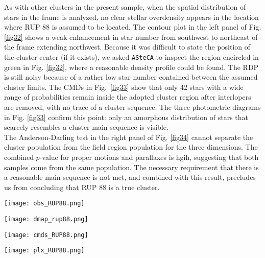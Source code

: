 \documentclass[draft]{aa}
\begin{document}
As with other clusters in the present sample, when the spatial distribution
of stars in the frame is analyzed, no clear stellar overdensity
appears in the location where RUP 88 is assumed to be located. The
contour plot in the left panel of Fig. \ref{fig32} shows a weak enhancement in star number from southwest to northeast of the frame extending northwest.
Because it was difficult to state the position of the cluster center (if it
exists), we asked \texttt{ASteCA} to inspect the region encircled in green in Fig.
\ref{fig32}, where a reasonable density profile could be found. The
RDP is still noisy because of a rather low star number contained between the
assumed cluster limits.
The CMDs in Fig.~\ref{fig33} show that only 42 stars with a wide
range of probabilities remain inside the adopted cluster region 
after interlopers are removed, with no trace of a cluster sequence.
The three photometric diagrams in Fig. \ref{fig33} confirm this point: only
an amorphous distribution of stars that scarcely resembles a cluster main sequence
is visible.\\

The Anderson-Darling test in the right panel of Fig. \ref{fig34} cannot
separate the cluster population from the field region population for the
three dimensions. The combined $p$-value for proper motions and
parallaxes is hgih, suggesting that both samples come from the same
population. The necessary requirement that there is a reasonable main
sequence is not met, and combined with this result, precludes
us from concluding that RUP 88 is a true cluster.

\begin{figure*}[ht]
    \centering
    \texttt{[image: obs\_RUP88.png]}
    \caption{Idem Fig. \ref{fig:photom_vdBH85} for RUP 88.}
    \label{fig31}
\end{figure*}
\begin{figure*}[ht]
    \centering
    \texttt{[image: dmap\_rup88.png]}
    \caption{Idem Fig. \ref{fig:struct_vdBH85} for RUP 88.}
    \label{fig32}
\end{figure*}
\begin{figure*}[ht]
    \centering
    \texttt{[image: cmds\_RUP88.png]}
    \caption{Idem Fig. \ref{fig:fundpars_vdBH85} for RUP 88
with the $(B-V)$ vs $(V-I)$ diagram instead of the $(B-V)$ vs. $(U-B)$
diagram.}
    \label{fig33}
\end{figure*}
\begin{figure*}[ht]
    \centering
    \texttt{[image: plx\_RUP88.png]}
    \caption{Idem Fig. \ref{fig:plx_bys_vdBH85} for RUP 88.}
    \label{fig34}
\end{figure*}
\end{document}
